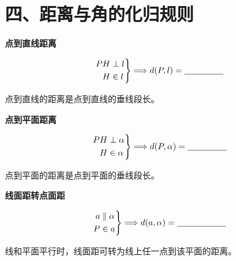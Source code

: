 \documentclass{exam-zh}
\begin{document}
\section*{四、距离与角的化归规则}


\begin{question}[points=5]
  \textbf{点到直线距离}\par
\[
\left.
\begin{aligned}
PH&\perp l\\
H&\in l
\end{aligned}
\right\}
\Longrightarrow
d(P,l)=\underline{\hspace{16mm}}
\]


  \paren[$PH$]
  \begin{solutionblock}
    点到直线的距离是点到直线的垂线段长。
  \end{solutionblock}
\end{question}



\begin{question}[points=5]
  \textbf{点到平面距离}\par
\[
\left.
\begin{aligned}
PH&\perp\alpha\\
H&\in\alpha
\end{aligned}
\right\}
\Longrightarrow
d(P,\alpha)=\underline{\hspace{16mm}}
\]


  \paren[$PH$]
  \begin{solutionblock}
    点到平面的距离是点到平面的垂线段长。
  \end{solutionblock}
\end{question}



\begin{question}[points=5]
  \textbf{线面距转点面距}\par
\[
\left.
\begin{aligned}
a&\parallel\alpha\\
P&\in a
\end{aligned}
\right\}
\Longrightarrow
d(a,\alpha)=\underline{\hspace{20mm}}
\]


  \paren[$d(P,\alpha)$]
  \begin{solutionblock}
    线和平面平行时，线面距可转为线上任一点到该平面的距离。
  \end{solutionblock}
\end{question}
\end{document}
